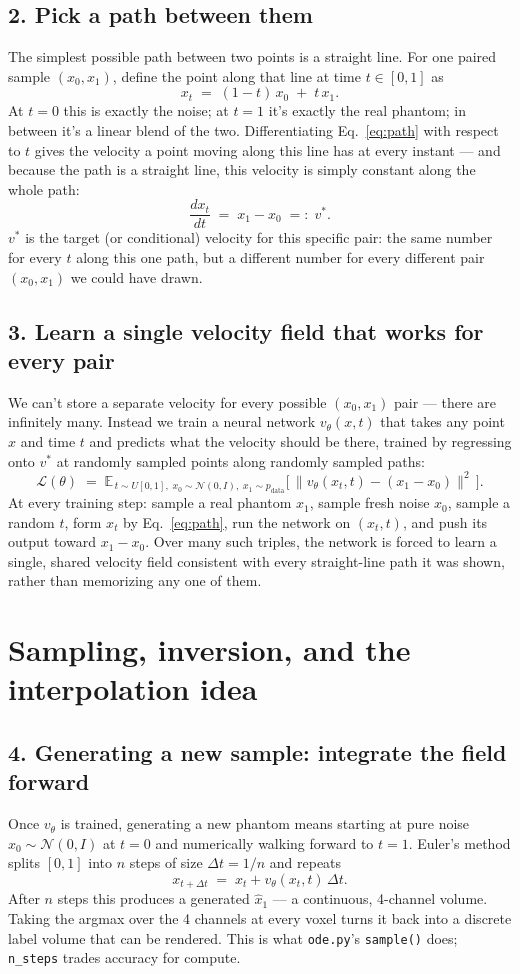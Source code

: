 \documentclass[11pt]{article}
\newcommand{\hsec}[1]{\section*{\color{hdrblue}#1}}
\newcommand{\hsub}[1]{\subsection*{#1}}
\begin{document}
\hsub{2. Pick a path between them}
The simplest possible path between two points is a straight line. For one paired sample
$(x_0, x_1)$, define the point along that line at time $t \in [0,1]$ as
\begin{equation}
x_t \;=\; (1-t)\,x_0 \;+\; t\,x_1. \label{eq:path}
\end{equation}
At $t=0$ this is exactly the noise; at $t=1$ it's exactly the real phantom; in between it's a
linear blend of the two. Differentiating Eq.~\eqref{eq:path} with respect to $t$ gives the
velocity a point moving along this line has at every instant --- and because the path is a
straight line, this velocity is simply constant along the whole path:
\begin{equation}
\frac{d x_t}{dt} \;=\; x_1 - x_0 \;=:\; v^*. \label{eq:vstar}
\end{equation}
$v^*$ is the target (or conditional) velocity for this specific pair: the same number for
every $t$ along this one path, but a different number for every different pair $(x_0,x_1)$ we
could have drawn.

\hsub{3. Learn a single velocity field that works for every pair}
We can't store a separate velocity for every possible $(x_0,x_1)$ pair --- there are
infinitely many. Instead we train a neural network $v_\theta(x,t)$ that takes any point $x$
and time $t$ and predicts what the velocity should be there, trained by regressing onto $v^*$
at randomly sampled points along randomly sampled paths:
\begin{equation}
\mathcal{L}(\theta) \;=\; \mathbb{E}_{\,t \sim U[0,1],\; x_0 \sim \mathcal{N}(0,I),\; x_1 \sim
p_{\text{data}}} \Big[\, \big\| v_\theta(x_t,t) - (x_1 - x_0) \big\|^2 \,\Big]. \label{eq:loss}
\end{equation}
At every training step: sample a real phantom $x_1$, sample fresh noise $x_0$, sample a
random $t$, form $x_t$ by Eq.~\eqref{eq:path}, run the network on $(x_t,t)$, and push its
output toward $x_1-x_0$. Over many such triples, the network is forced to learn a single,
shared velocity field consistent with every straight-line path it was shown, rather than
memorizing any one of them.

\hsec{Sampling, inversion, and the interpolation idea}

\hsub{4. Generating a new sample: integrate the field forward}
Once $v_\theta$ is trained, generating a new phantom means starting at pure noise
$x_0 \sim \mathcal{N}(0,I)$ at $t=0$ and numerically walking forward to $t=1$. Euler's method
splits $[0,1]$ into $n$ steps of size $\Delta t = 1/n$ and repeats
\begin{equation}
x_{t+\Delta t} \;=\; x_t + v_\theta(x_t,t)\,\Delta t. \label{eq:euler-fwd}
\end{equation}
After $n$ steps this produces a generated $\hat x_1$ --- a continuous, 4-channel volume.
Taking the argmax over the 4 channels at every voxel turns it back into a discrete label
volume that can be rendered. This is what \texttt{ode.py}'s \texttt{sample()} does;
\texttt{n\_steps} trades accuracy for compute.
\end{document}
